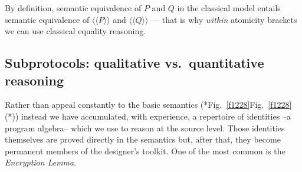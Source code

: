 \documentclass[runningheads]{llncs}
\newcommand\Atomic[1] {\AtomicOpen#1\AtomicClose}
\newcommand\AtomicOpen {\langle\!\langle}
\newcommand\AtomicClose {\rangle\!\rangle}
\newcommand\Fig[2][*] {{\def\z{#1}\if*\z Fig.~\ref{#2}\else Fig.~\ref{#2}(#1)\fi}}
\begin{document}
By definition, semantic equivalence of $P$ and $Q$ in the classical model entails semantic equivalence of $\Atomic{P}$ and $\Atomic{Q}$ --- that is why \emph{within} atomicity brackets we can use classical equality reasoning.

\subsection{Subprotocols: qualitative vs.\ quantitative reasoning}

Rather than appeal constantly to the basic semantics (\Fig{f1228}) instead we have accumulated, with experience, a repertoire of identities --a program algebra-- which we use to reason at the source level. Those identities themselves are proved directly in the semantics but, after that, they become permanent members of the designer's toolkit. One of the most common is the \emph{Encryption Lemma}.
\end{document}
